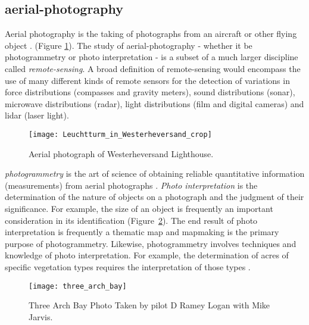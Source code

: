 \subsection{\Gls{aerial-photography}}
Aerial photography is the taking of photographs from an aircraft or other
flying object \cite{aerial_dict}. (Figure
\ref{fig:westerheversand_lighthouse}). The study of \gls{aerial-photography} -
whether it be \gls{photogrammetry} or photo interpretation - is a subset of a
much larger discipline called \emph{\gls{remote-sensing}}. A broad definition of
\gls{remote-sensing} would encompass the use of many different kinds of remote
sensors for the detection of variations in force distributions (compasses
and gravity meters), sound distributions (sonar), microwave distributions
(radar), light distributions (film and digital cameras) and lidar (laser
light).
\begin{figure}[h]
    \centering
    \texttt{[image: Leuchtturm\_in\_Westerheversand\_crop]}
    \caption{Aerial photograph of Westerheversand Lighthouse.}
    \label{fig:westerheversand_lighthouse}
\end{figure}


\emph{\Gls{photogrammetry}} is the art of science of obtaining reliable quantitative
information (measurements) from aerial photographs \cite{citeulike:4129109}.
\emph{Photo interpretation} is the determination of the nature of objects on
a photograph and the judgment of their significance. For example, the size of
an object is frequently an important consideration in its identification
(Figure~\ref{fig:three_arch_bay}). The end result of photo interpretation is
frequently a thematic map and mapmaking is the primary purpose of
\gls{photogrammetry}. Likewise, \gls{photogrammetry} involves techniques and knowledge of
photo interpretation. For example, the determination of acres of specific
vegetation types requires the interpretation of those types \cite{book:834597}.
\begin{figure}[h]
    \centering
    \texttt{[image: three\_arch\_bay]}
    \caption{Three Arch Bay Photo Taken by pilot D Ramey Logan with Mike
    Jarvis.}
    \label{fig:three_arch_bay}
\end{figure}
